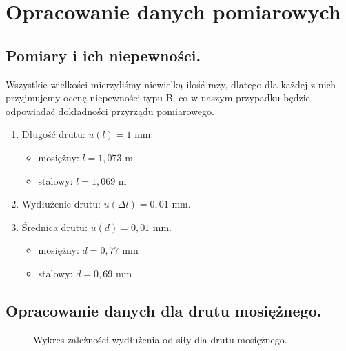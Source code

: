 \documentclass [a4paper,11pt]{article}
\begin{document}
	\renewcommand*{\figurename}{Wykres} 
	\setcounter{figure}{0}
	\newpage
	\section{Opracowanie danych pomiarowych}\label{sec:opr}
	\subsection{Pomiary i ich niepewności.}
		
		Wszystkie wielkości mierzyliśmy niewielką ilość razy, dlatego dla każdej z nich przyjmujemy ocenę niepewności typu B, co w naszym przypadku będzie odpowiadać dokładności przyrządu pomiarowego.
		\begin{enumerate}
			\item  Długość drutu: $u(l) = 1 \text{ mm}$.
			\begin{itemize}
				\item mosiężny: $ l = 1,073 \text{ m} $
				\item stalowy: $ l = 1,069 \text{ m} $
			\end{itemize}
			\item  Wydłużenie drutu: $u(\Delta l) = 0,01 \text{ mm}$.
			\item  Średnica drutu: $u(d) = 0,01 \text{ mm}$.
			\begin{itemize}
				\item mosiężny: $ d = 0,77 \text{ mm} $
				\item stalowy: $ d = 0,69 \text{ mm} $
			\end{itemize}
		\end{enumerate} 
	
	\subsection{Opracowanie danych dla drutu mosiężnego.}\label{sec:drm}
	\renewcommand*{\figurename}{Wykres} 
	\setcounter{figure}{1}
	\begin{figure}[!h]
		\centering
		\caption{Wykres zależności wydłużenia od siły dla drutu mosiężnego.}
		\label{fig:wykmosiadz}
	\end{figure}
\end{document}
